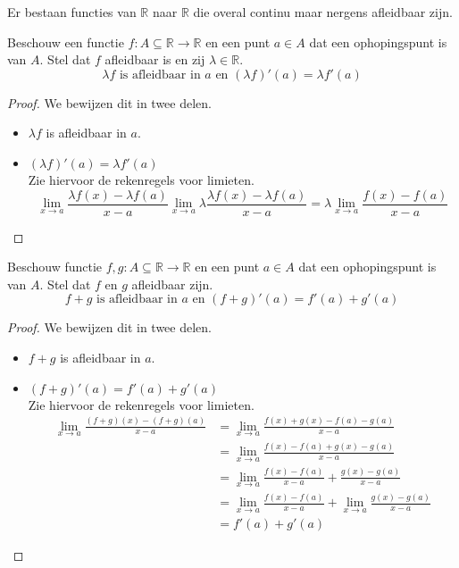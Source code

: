 \documentclass[main.tex]{subfiles}
\begin{document}
\begin{bst}
  Er bestaan functies van $\mathbb{R}$ naar $\mathbb{R}$ die overal continu maar nergens afleidbaar zijn.
\end{bst}

\begin{bpr}
  Beschouw een functie $f: A \subseteq \mathbb{R} \rightarrow \mathbb{R}$ en een punt $a\in A$ dat een ophopingspunt is van $A$.
  Stel dat $f$ afleidbaar is en zij $\lambda \in \mathbb{R}$.
  \[ \lambda f \text{ is afleidbaar in } a \text{ en } (\lambda f)'(a) = \lambda f'(a) \]

  \begin{proof}
    We bewijzen dit in twee delen.
    \begin{itemize}
    \item $\lambda f$ is afleidbaar in $a$.
    \item $(\lambda f)'(a) = \lambda f'(a)$\\
      Zie hiervoor de rekenregels voor limieten.
      \[ \lim_{x \rightarrow a}\frac{\lambda f(x)-\lambda f(a)}{x-a} \lim_{x \rightarrow a}\lambda \frac{\lambda f(x)-\lambda f(a)}{x-a} = \lambda \lim_{x \rightarrow a}\frac{f(x)-f(a)}{x-a} \]
    \end{itemize}
  \end{proof}
\end{bpr}


\begin{bpr}
  Beschouw functie $f,g: A \subseteq \mathbb{R} \rightarrow \mathbb{R}$ en een punt $a\in A$ dat een ophopingspunt is van $A$.
  Stel dat $f$ en $g$ afleidbaar zijn.
  \[ f+g \text{ is afleidbaar in } a \text{ en } (f+g)'(a) = f'(a) + g'(a) \]

  \begin{proof}
    We bewijzen dit in twee delen.
    \begin{itemize}
    \item $f+g$ is afleidbaar in $a$.
    \item $(f+g)'(a) = f'(a) + g'(a)$\\
      Zie hiervoor de rekenregels voor limieten.
      \[
      \begin{array}{rl}
        \lim_{x \rightarrow a}\frac{(f+g)(x)-(f+g)(a)}{x-a}
        &= \lim_{x \rightarrow a}\frac{f(x)+g(x)-f(a)-g(a)}{x-a}\\
        &= \lim_{x \rightarrow a}\frac{f(x)-f(a)+g(x)-g(a)}{x-a}\\
        &= \lim_{x \rightarrow a}\frac{f(x)-f(a)}{x-a}+\frac{g(x)-g(a)}{x-a}\\
        &= \lim_{x \rightarrow a}\frac{f(x)-f(a)}{x-a}+\lim_{x \rightarrow a}\frac{g(x)-g(a)}{x-a}\\
        &= f'(a) + g'(a)
      \end{array}
      \]
    \end{itemize}

  \end{proof}
\end{bpr}
\end{document}
